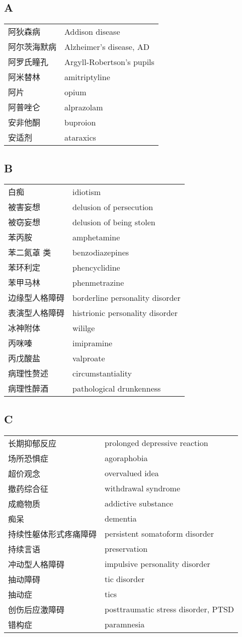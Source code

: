 \subsection*{A}

\begin{longtable}[]{@{}ll@{}}
\toprule
\endhead
阿狄森病 & Addison disease\tabularnewline
阿尔茨海默病 & Alzheimer's disease, AD\tabularnewline
阿罗氏瞳孔 & Argyll-Robertson's pupils\tabularnewline
阿米替林 & amitriptyline\tabularnewline
阿片 & opium\tabularnewline
阿普唑仑 & alprazolam\tabularnewline
安非他酮 & buproion\tabularnewline
安适剂 & ataraxics\tabularnewline
\bottomrule
\end{longtable}

\subsection*{B}

\begin{longtable}[]{@{}ll@{}}
\toprule
\endhead
白痴 & idiotism\tabularnewline
被害妄想 & delusion of persecution\tabularnewline
被窃妄想 & delusion of being stolen\tabularnewline
苯丙胺 & amphetamine\tabularnewline
苯二氮䓬 类 &
benzodiazepines\tabularnewline
苯环利定 & phencyclidine\tabularnewline
苯甲马林 & phenmetrazine\tabularnewline
边缘型人格障碍 & borderline personality disorder\tabularnewline
表演型人格障碍 & histrionic personality disorder\tabularnewline
冰神附体 & wililge\tabularnewline
丙咪嗪 & imipramine\tabularnewline
丙戊酸盐 & valproate\tabularnewline
病理性赘述 & circumstantiality\tabularnewline
病理性醉酒 & pathological drunkenness\tabularnewline
\bottomrule
\end{longtable}

\subsection*{C}

\begin{longtable}[]{@{}ll@{}}
\toprule
\endhead
长期抑郁反应 & prolonged depressive reaction\tabularnewline
场所恐惧症 & agoraphobia\tabularnewline
超价观念 & overvalued idea\tabularnewline
撤药综合征 & withdrawal syndrome\tabularnewline
成瘾物质 & addictive substance\tabularnewline
痴呆 & dementia\tabularnewline
持续性躯体形式疼痛障碍 & persistent somatoform disorder\tabularnewline
持续言语 & preservation\tabularnewline
冲动型人格障碍 & impulsive personality disorder\tabularnewline
抽动障碍 & tic disorder\tabularnewline
抽动症 & tics\tabularnewline
创伤后应激障碍 & posttraumatic stress disorder, PTSD\tabularnewline
错构症 & paramnesia\tabularnewline
\bottomrule
\end{longtable}

